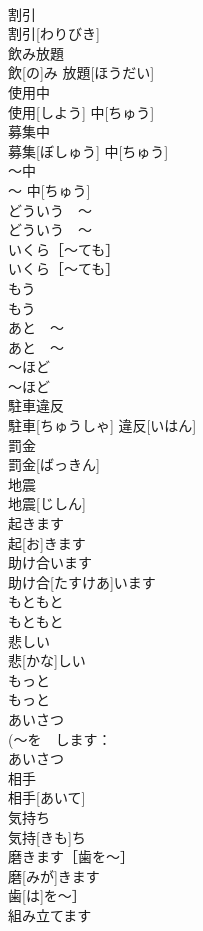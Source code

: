 \documentclass[8pt]{extreport}
\begin{document}
\begin{CJK}{UTF8}{min}
\\	割引	
\\	割引[わりびき]	
\\	飲み放題	
\\	飲[の]み 放題[ほうだい]	
\\	使用中	
\\	使用[しよう] 中[ちゅう]	
\\	募集中	
\\	募集[ぼしゅう] 中[ちゅう]	
\\	〜中	
\\	〜 中[ちゅう]	
\\	どういう　〜	
\\	どういう　〜	
\\	いくら［〜ても］	
\\	いくら［〜ても］	
\\	もう	
\\	もう	
\\	あと　〜	
\\	あと　〜	
\\	〜ほど	
\\	〜ほど	
\\	駐車違反	
\\	駐車[ちゅうしゃ] 違反[いはん]	
\\	罰金	
\\	罰金[ばっきん]	
\\	地震	
\\	地震[じしん]	
\\	起きます	
\\	起[お]きます	
\\	助け合います	
\\	助け合[たすけあ]います	
\\	もともと	
\\	もともと	
\\	悲しい	
\\	悲[かな]しい	
\\	もっと	
\\	もっと	
\\	あいさつ	
\\	(〜を　します：
\\	あいさつ	
\\	相手	
\\	相手[あいて]	
\\	気持ち	
\\	気持[きも]ち	
\\	磨きます［歯を〜］	
\\	磨[みが]きます
\\	歯[は]を〜］	
\\	組み立てます	

\end{CJK}
\end{document}
